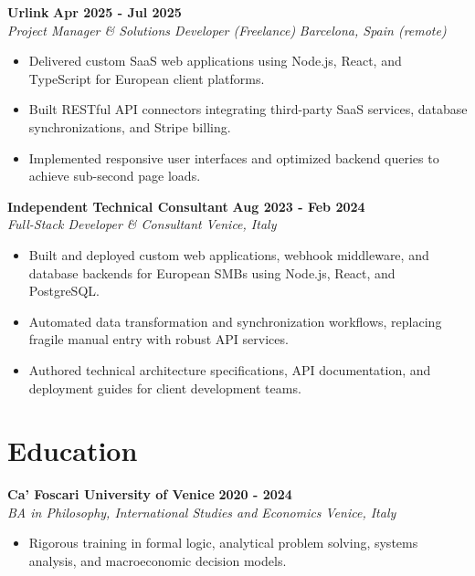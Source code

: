 \documentclass[10pt,a4paper]{article}
\newcommand{\role}[4]{%
  \textbf{#1} \hfill \textbf{#2}\\[1pt]%
  \textit{#3} \hfill \textit{#4}\\[2pt]%
}
\begin{document}
\role{Urlink}{Apr 2025 - Jul 2025}{Project Manager \& Solutions Developer (Freelance)}{Barcelona, Spain (remote)}
\begin{itemize}
  \item Delivered custom SaaS web applications using Node.js, React, and TypeScript for European client platforms.
  \item Built RESTful API connectors integrating third-party SaaS services, database synchronizations, and Stripe billing.
  \item Implemented responsive user interfaces and optimized backend queries to achieve sub-second page loads.
\end{itemize}

\role{Independent Technical Consultant}{Aug 2023 - Feb 2024}{Full-Stack Developer \& Consultant}{Venice, Italy}
\begin{itemize}
  \item Built and deployed custom web applications, webhook middleware, and database backends for European SMBs using Node.js, React, and PostgreSQL.
  \item Automated data transformation and synchronization workflows, replacing fragile manual entry with robust API services.
  \item Authored technical architecture specifications, API documentation, and deployment guides for client development teams.
\end{itemize}

\section{Education}
\role{Ca' Foscari University of Venice}{2020 - 2024}{BA in Philosophy, International Studies and Economics}{Venice, Italy}
\begin{itemize}
  \item Rigorous training in formal logic, analytical problem solving, systems analysis, and macroeconomic decision models.
\end{itemize}
\end{document}
